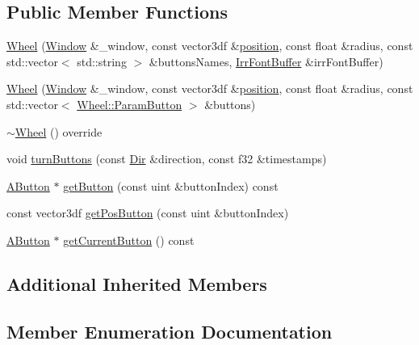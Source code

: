 \subsection*{Public Member Functions}
\begin{DoxyCompactItemize}
\item 
\mbox{\hyperlink{class_wheel_a2a5799dbe85ddadfc4ef50e69602d5df}{Wheel}} (\mbox{\hyperlink{class_window}{Window}} \&\+\_\+window, const vector3df \&\mbox{\hyperlink{class_menu_element_a7f59490282ff54f6c82ee478c8ea6cc1}{position}}, const float \&radius, const std\+::vector$<$ std\+::string $>$ \&buttons\+Names, \mbox{\hyperlink{class_irr_font_buffer}{Irr\+Font\+Buffer}} \&irr\+Font\+Buffer)
\item 
\mbox{\hyperlink{class_wheel_a2dda8257d6aa2bc6c2c657e724db1803}{Wheel}} (\mbox{\hyperlink{class_window}{Window}} \&\+\_\+window, const vector3df \&\mbox{\hyperlink{class_menu_element_a7f59490282ff54f6c82ee478c8ea6cc1}{position}}, const float \&radius, const std\+::vector$<$ \mbox{\hyperlink{struct_wheel_1_1_param_button}{Wheel\+::\+Param\+Button}} $>$ \&buttons)
\item 
\mbox{\hyperlink{class_wheel_a947c31796408a9bb9b6a01629c093806}{$\sim$\+Wheel}} () override
\item 
void \mbox{\hyperlink{class_wheel_a925987839e4f1137b975cb43d49c6771}{turn\+Buttons}} (const \mbox{\hyperlink{class_wheel_ae7bd200dca893d41c3177b4c356dad6e}{Dir}} \&direction, const f32 \&timestamps)
\item 
\mbox{\hyperlink{class_a_button}{A\+Button}} $\ast$ \mbox{\hyperlink{class_wheel_a873fe00de07b96a68156204c06d85310}{get\+Button}} (const uint \&button\+Index) const
\item 
const vector3df \mbox{\hyperlink{class_wheel_a7306c439e5da787bf3f1402216ecfc4b}{get\+Pos\+Button}} (const uint \&button\+Index)
\item 
\mbox{\hyperlink{class_a_button}{A\+Button}} $\ast$ \mbox{\hyperlink{class_wheel_a691db55aeb41d47eb065b5bffd0d8798}{get\+Current\+Button}} () const
\end{DoxyCompactItemize}
\subsection*{Additional Inherited Members}


\subsection{Member Enumeration Documentation}
\mbox{\label{class_wheel_ae7bd200dca893d41c3177b4c356dad6e}} 
